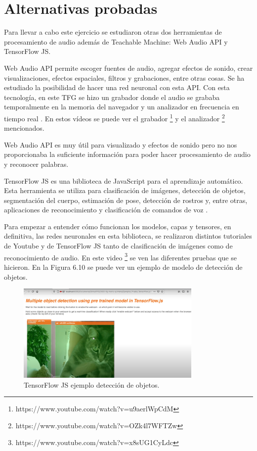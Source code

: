 \section{Alternativas probadas}

Para llevar a cabo este ejercicio se estudiaron otras dos herramientas de procesamiento de audio además de Teachable Machine: Web Audio API y TensorFlow JS.

Web Audio API permite escoger fuentes de audio, agregar efectos de sonido, crear visualizaciones, efectos espaciales, filtros y grabaciones, entre otras cosas.
Se ha estudiado la  posibilidad de hacer una red neuronal con esta API. Con esta tecnología, en este TFG se hizo un grabador donde el audio se grababa temporalmente en la memoria del navegador y un analizador en frecuencia en tiempo real \cite{waa} .  En estos vídeos se puede ver el grabador \footnote{https://www.youtube.com/watch?v=u9aerlWpCdM} y el analizador \footnote{https://www.youtube.com/watch?v=OZk4l7WFTZw} mencionados.

Web Audio API es muy útil para visualizado y efectos de sonido pero no nos proporcionaba la suficiente información para poder hacer procesamiento de audio y reconocer palabras.

TensorFlow JS es una biblioteca de JavaScript para el aprendizaje automático. Esta herramienta se utiliza para clasificación de imágenes, detección de objetos, segmentación del cuerpo, estimación de pose, detección de rostros y, entre otras, aplicaciones de reconocimiento y clasificación de comandos de voz \cite{tensorflowmodel}.

Para empezar a entender cómo funcionan los modelos, capas y  tensores, en definitiva,  las redes neuronales en esta biblioteca, se realizaron distintos tutoriales de Youtube y de TensorFlow JS tanto de clasificación de imágenes como de reconocimiento de audio. En este video \footnote{https://www.youtube.com/watch?v=x8sUG1CyLdc} se ven las diferentes pruebas que se hicieron. En la Figura 6.10 se puede ver un ejemplo de modelo de detección de objetos.

\begin{figure}[H]
    \centering
    \includegraphics[width=0.8\textwidth, height=0.45\textwidth]{chapters/images/imagerecognition.png}
    \caption{TensorFlow JS ejemplo detección de objetos. }
    \label{fig:my_label}
\end{figure}

